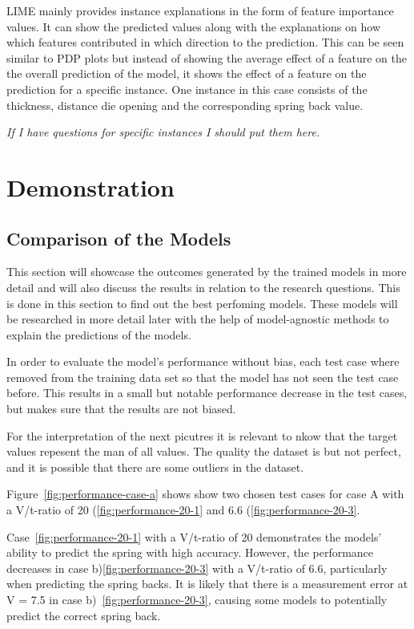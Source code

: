 LIME mainly provides instance explanations in the form of feature importance values.
It can show the predicted values along with the explanations on how which features contributed
in which direction to the prediction.
This can be seen similar to PDP plots but instead of showing the average effect of a feature
on the the overall prediction of the model, it shows the effect of a feature on the prediction
for a specific instance.
One instance in this case consists of the thickness, distance die opening and the corresponding
spring back value.


\textit{If I have questions for specific instances I should put them here.}


\section{Demonstration}\label{sec:demonstration}

\subsection{Comparison of the Models}\label{subsec:overall-comparison-model-performance}
This section will showcase the outcomes generated by the trained models in more detail and
will also discuss the results in relation to the research questions.
This is done in this section to find out the best perfoming models.
These models will be researched in more detail later with the help of model-agnostic
methods to explain the predictions of the models.

In order to evaluate the model's performance without bias, each test case where removed
from the training data set so that the model has not seen the test case before.
This results in a small but notable performance decrease in the test cases, but makes sure that the
results are not biased.

For the interpretation of the next picutres it is relevant to nkow that the target values
repesent the man of all values.
The quality the dataset is but not perfect, and it is possible that there are some outliers in the
dataset.

Figure~\ref{fig:performance-case-a} shows show two chosen test cases for case A with a
V/t-ratio of 20 (\ref{fig:performance-20-1} and 6.6 (\ref{fig:performance-20-3}.

Case~\ref{fig:performance-20-1} with a V/t-ratio of 20 demonstrates the models'
ability to predict the spring with high accuracy.
However, the performance decreases in case b)\ref{fig:performance-20-3} with a V/t-ratio
of 6.6, particularly when predicting the spring backs.
It is likely that there is a measurement error at V = 7.5 in case
b)~\ref{fig:performance-20-3}, causing some models to potentially predict the correct
spring back.


